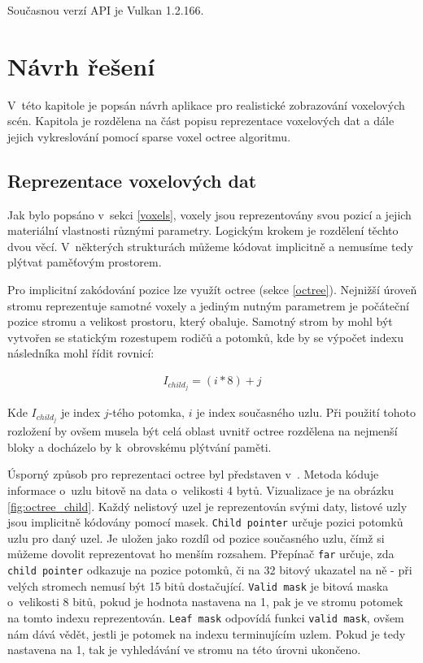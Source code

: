 Současnou verzí API je Vulkan 1.2.166\cite{vulkanspec}.

\chapter{Návrh řešení}
\label{navrh}
V~této kapitole je popsán návrh aplikace pro realistické zobrazování voxelových scén. Kapitola je rozdělena na část popisu reprezentace voxelových dat a dále jejich vykreslování pomocí sparse voxel octree algoritmu.

\section{Reprezentace voxelových dat}\label{sec:voxel_representation}
Jak bylo popsáno v~sekci \ref{voxels}, voxely jsou reprezentovány svou pozicí a jejich materiální vlastnosti různými parametry. Logickým krokem je rozdělení těchto dvou věcí. V~některých strukturách můžeme kódovat implicitně a nemusíme tedy plýtvat paměťovým prostorem.

Pro implicitní zakódování pozice lze využít octree (sekce \ref{octree}). Nejnižší úroveň stromu reprezentuje samotné voxely a jediným nutným parametrem je počáteční pozice stromu a velikost prostoru, který obaluje. Samotný strom by mohl být vytvořen se statickým rozestupem rodičů a potomků, kde by se výpočet indexu následníka mohl řídit rovnicí:

\begin{equation} \label{eq:simple_octree_index}
	\begin{gathered}
		I_{child_j} = (i * 8) + j
	\end{gathered}
\end{equation}

Kde $I_{child_j}$ je index $j$-tého potomka, $i$ je index současného uzlu. Při použití tohoto rozložení by ovšem musela být celá oblast uvnitř octree rozdělena na nejmenší bloky a docházelo by k~obrovskému plýtvání paměti.

Úsporný způsob pro reprezentaci octree byl představen v~\cite{Laine2011EfficientSV}. Metoda kóduje informace o~uzlu bitově na data o~velikosti 4 bytů. Vizualizace je na obrázku \ref{fig:octree_child}. Každý nelistový uzel je reprezentován svými daty, listové uzly jsou implicitně kódovány pomocí masek. \texttt{Child pointer} určuje pozici potomků uzlu pro daný uzel. Je uložen jako rozdíl od pozice současného uzlu, čímž si můžeme dovolit reprezentovat ho menším rozsahem. Přepínač \texttt{far} určuje, zda \texttt{child pointer} odkazuje na pozice potomků, či na 32 bitový ukazatel na ně - při velých stromech nemusí být 15 bitů dostačující. \texttt{Valid mask} je bitová maska o~velikosti 8 bitů, pokud je hodnota nastavena na 1, pak je ve stromu potomek na tomto indexu reprezentován. \texttt{Leaf mask} odpovídá funkci \texttt{valid mask}, ovšem nám dává vědět, jestli je potomek na indexu terminujícím uzlem. Pokud je tedy nastavena na 1, tak je vyhledávání ve stromu na této úrovni ukončeno.

